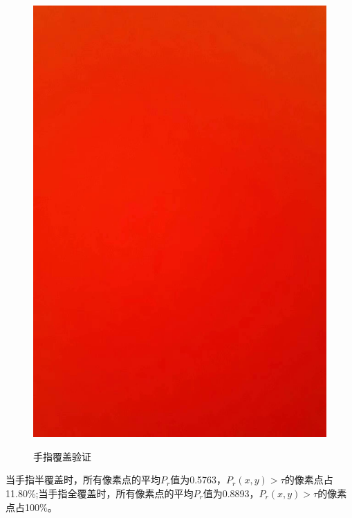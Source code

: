 \begin{figure}[htbp]
{\begin{minipage}[t]{0.2\textwidth}
        \includegraphics[width=1\textwidth]{images/cover.jpg}
        \label{3-3}
        \end{minipage}
        }
    \caption{手指覆盖验证}
\end{figure}

\par
{当手指半覆盖时，所有像素点的平均$P_r$值为0.5763，$P_r(x,y)>\tau$的像素点占11.80\%;当手指全覆盖时，所有像素点的平均$P_r$值为0.8893，$P_r(x,y)>\tau$的像素点占100\%。}

